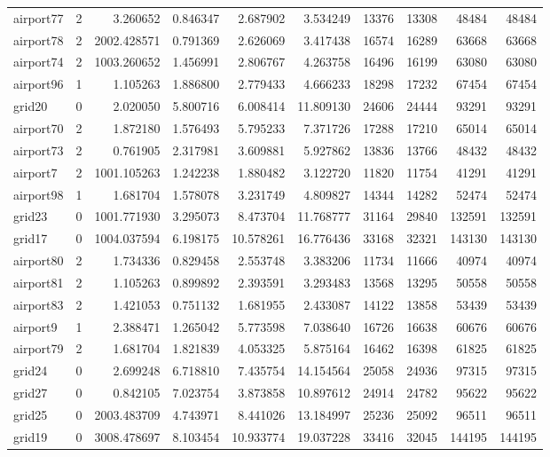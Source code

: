 \begin{longtable}{|l|r|r|r|r|r|r|r|r|r|}
airport77 & 2 & 3.260652 & 0.846347 & 2.687902 & 3.534249 & 13376 & 13308 & 48484 & 48484 \\
airport78 & 2 & 2002.428571 & 0.791369 & 2.626069 & 3.417438 & 16574 & 16289 & 63668 & 63668 \\
airport74 & 2 & 1003.260652 & 1.456991 & 2.806767 & 4.263758 & 16496 & 16199 & 63080 & 63080 \\
airport96 & 1 & 1.105263 & 1.886800 & 2.779433 & 4.666233 & 18298 & 17232 & 67454 & 67454 \\
grid20 & 0 & 2.020050 & 5.800716 & 6.008414 & 11.809130 & 24606 & 24444 & 93291 & 93291 \\
airport70 & 2 & 1.872180 & 1.576493 & 5.795233 & 7.371726 & 17288 & 17210 & 65014 & 65014 \\
airport73 & 2 & 0.761905 & 2.317981 & 3.609881 & 5.927862 & 13836 & 13766 & 48432 & 48432 \\
airport7 & 2 & 1001.105263 & 1.242238 & 1.880482 & 3.122720 & 11820 & 11754 & 41291 & 41291 \\
airport98 & 1 & 1.681704 & 1.578078 & 3.231749 & 4.809827 & 14344 & 14282 & 52474 & 52474 \\
grid23 & 0 & 1001.771930 & 3.295073 & 8.473704 & 11.768777 & 31164 & 29840 & 132591 & 132591 \\
grid17 & 0 & 1004.037594 & 6.198175 & 10.578261 & 16.776436 & 33168 & 32321 & 143130 & 143130 \\
airport80 & 2 & 1.734336 & 0.829458 & 2.553748 & 3.383206 & 11734 & 11666 & 40974 & 40974 \\
airport81 & 2 & 1.105263 & 0.899892 & 2.393591 & 3.293483 & 13568 & 13295 & 50558 & 50558 \\
airport83 & 2 & 1.421053 & 0.751132 & 1.681955 & 2.433087 & 14122 & 13858 & 53439 & 53439 \\
airport9 & 1 & 2.388471 & 1.265042 & 5.773598 & 7.038640 & 16726 & 16638 & 60676 & 60676 \\
airport79 & 2 & 1.681704 & 1.821839 & 4.053325 & 5.875164 & 16462 & 16398 & 61825 & 61825 \\
grid24 & 0 & 2.699248 & 6.718810 & 7.435754 & 14.154564 & 25058 & 24936 & 97315 & 97315 \\
grid27 & 0 & 0.842105 & 7.023754 & 3.873858 & 10.897612 & 24914 & 24782 & 95622 & 95622 \\
grid25 & 0 & 2003.483709 & 4.743971 & 8.441026 & 13.184997 & 25236 & 25092 & 96511 & 96511 \\
grid19 & 0 & 3008.478697 & 8.103454 & 10.933774 & 19.037228 & 33416 & 32045 & 144195 & 144195 \\

\end{longtable}
